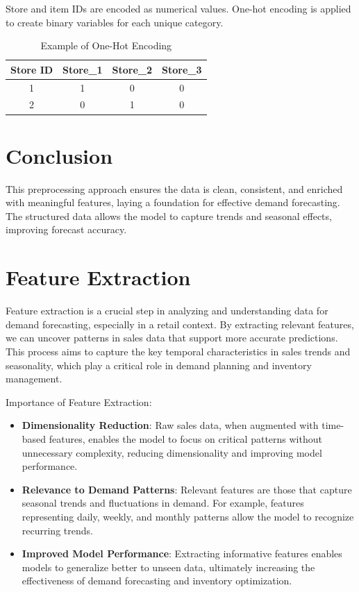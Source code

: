 Store and item IDs are encoded as numerical values. One-hot encoding is applied to create binary variables for each unique category.

\begin{table}[H]
\centering
\caption{Example of One-Hot Encoding}
\begin{tabular}{|c|c|c|c|}
\hline
\textbf{Store ID} & \textbf{Store\_1} & \textbf{Store\_2} & \textbf{Store\_3} \\ \hline
1 & 1 & 0 & 0 \\ \hline
2 & 0 & 1 & 0 \\ \hline
\end{tabular}
\end{table}

\section*{Conclusion}

This preprocessing approach ensures the data is clean, consistent, and enriched with meaningful features, laying a foundation for effective demand forecasting. The structured data allows the model to capture trends and seasonal effects, improving forecast accuracy.

\section{Feature Extraction}


Feature extraction is a crucial step in analyzing and understanding data for demand forecasting, especially in a retail context. By extracting relevant features, we can uncover patterns in sales data that support more accurate predictions. This process aims to capture the key temporal characteristics in sales trends and seasonality, which play a critical role in demand planning and inventory management.

Importance of Feature Extraction:
\begin{itemize}
    \item \textbf{Dimensionality Reduction}: Raw sales data, when augmented with time-based features, enables the model to focus on critical patterns without unnecessary complexity, reducing dimensionality and improving model performance.
    \item \textbf{Relevance to Demand Patterns}: Relevant features are those that capture seasonal trends and fluctuations in demand. For example, features representing daily, weekly, and monthly patterns allow the model to recognize recurring trends.
    \item \textbf{Improved Model Performance}: Extracting informative features enables models to generalize better to unseen data, ultimately increasing the effectiveness of demand forecasting and inventory optimization.
\end{itemize}

